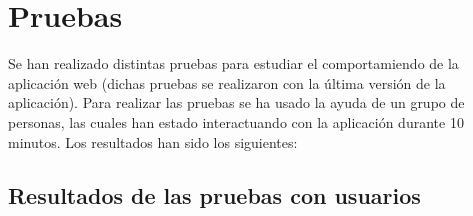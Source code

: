 \chapter{Pruebas}

Se han realizado distintas pruebas para estudiar el comportamiendo de la aplicación web (dichas pruebas se realizaron con la última versión de la aplicación). Para realizar las pruebas se ha usado la ayuda de un grupo de personas, las cuales han estado interactuando con la aplicación durante 10 minutos. Los resultados han sido los siguientes:

\section{Resultados de las pruebas con usuarios}